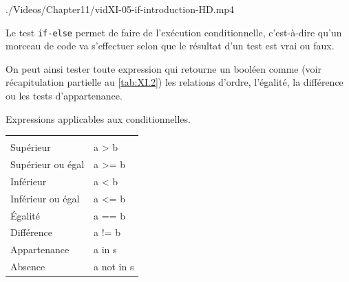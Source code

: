 \begin{marginvideo}
		{./Videos/Chapter11/vidXI-05-if-introduction-HD.mp4}%
\end{marginvideo}

Le test \texttt{if-else} permet de faire de l'exécution conditionnelle, c'est-à-dire qu'un morceau de code va s'effectuer selon que le résultat d'un test est vrai ou faux.

On peut ainsi tester toute expression qui retourne un booléen com\-me (voir récapitulation partielle au \cref{tab:XI.2}) les relations d'ordre, l'égalité, la différence ou les tests d'appartenance.

\begin{margintable}
\caption{\label{tab:XI.2}Expressions applicables aux conditionnelles.}
\small
\renewcommand*{\arraystretch}{1.6}
\begin{tabularx}{\linewidth}{l>{\ttfamily}Y}
 &
 \\
Supérieur & a > b \\
Supérieur ou égal & a >= b \\
Inférieur & a < b \\
Inférieur ou égal & a <= b \\
Égalité & a == b \\
Différence & a != b \\
Appartenance & a in s\\
Absence & a not in s \\
\end{tabularx}%
\end{margintable}

